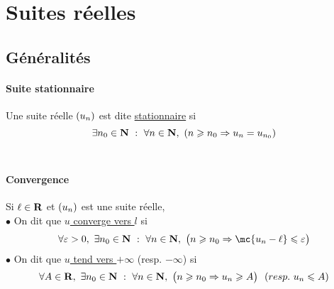 	\section{Suites réelles}
	\subsection{Généralités}
		\traitd
		\paragraph{Suite stationnaire}
			Une suite réelle $(u_n)$ est dite \uline{stationnaire} si
			\[\exists n_0\in{\mathbf{N}} ~:~\forall n\in {\mathbf{N}} ,~ (n\geqslant n_0 \Rightarrow u_n = u_{n_0})\] \trait
		 \\ \traitd
		\paragraph{Convergence}
			Si $\ell\in{\mathbf{R}}$ et $(u_n)$ est une suite réelle, \\
			$\bullet$ On dit que \uline{$u$ converge vers $l$} si 
			\[ \forall\varepsilon>0 ,~\exists n_0\in\N ~:~\forall n\in \N,~\big( n\geqslant n_0 \Rightarrow \mc{u_n-\ell}\leqslant\varepsilon \big) \] 
			$\bullet$ On dit que \uline{$u$ tend vers $+\infty$} (resp. $-\infty$) si 
			\[ \forall A\in {\mathbf{R}} ,~\exists n_0\in{\mathbf{N}} ~:~\forall n\in{\mathbf{N}} ,~\big( n\geqslant n_0 \Rightarrow u_n \geqslant A \big) ~~(resp.~u_n\leqslant A) \] 
			\trait \newpage \traitd
